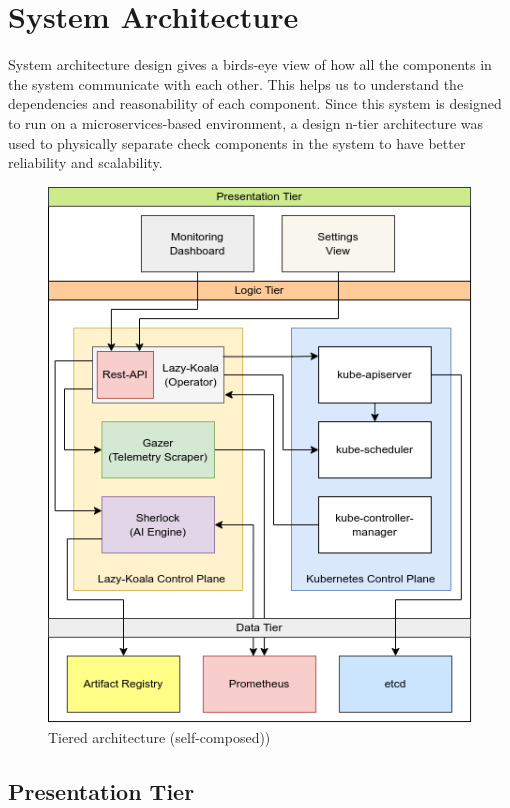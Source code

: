 \section{System Architecture}

System architecture design gives a birds-eye view of how all the components in the system communicate with each other. This helps us to understand the dependencies and reasonability of each component. Since this system is designed to run on a microservices-based environment, a design n-tier architecture was used to physically separate check components in the system to have better reliability and scalability.

\begin{figure}[H]
    \includegraphics[width=14cm]{assets/system-design/tier-architecture.png}
    \caption{Tiered architecture (self-composed))}
    \label{fig:tier-architecture}
\end{figure}

\subsection{Presentation Tier}

